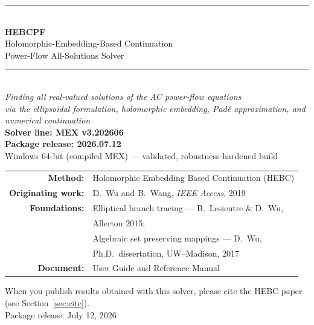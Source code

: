 \documentclass[11pt,a4paper]{article}
\begin{document}
\begin{titlepage}
\centering
\vspace*{2.2cm}
{\color{rule}\rule{\textwidth}{1.2pt}}\\[8pt]
{\Huge\bfseries HEBCPF}\\[10pt]
{\LARGE Holomorphic-Embedding-Based Continuation}\\[4pt]
{\LARGE Power-Flow All-Solutions Solver}\\[10pt]
{\color{rule}\rule{\textwidth}{1.2pt}}\\[18pt]
{\large\itshape Finding \emph{all} real-valued solutions of the AC power-flow equations}\\[6pt]
{\large\itshape via the ellipsoidal formulation, holomorphic embedding, Pad\'e approximation, and numerical continuation}\\[26pt]

{\large\bfseries Solver line: MEX v3.202606}\\[2pt]
{\large\bfseries Package release: 2026.07.12}\\[4pt]
{\large Windows 64-bit (compiled MEX) --- validated, robustness-hardened build}\\[12pt]

\begin{tabular}{rl}
\textbf{Method:} & Holomorphic Embedding Based Continuation (HEBC)\\[3pt]
\textbf{Originating work:} & D.\ Wu and B.\ Wang, \emph{IEEE Access}, 2019\\[6pt]
\textbf{Foundations:} & Elliptical branch tracing --- B.\ Lesieutre \& D.\ Wu,\\[1pt]
                      & Allerton 2015;\\[3pt]
                      & Algebraic set preserving mappings --- D.\ Wu,\\[1pt]
                      & Ph.D.\ dissertation, UW--Madison, 2017\\[6pt]
\textbf{Document:} & User Guide and Reference Manual\\
\end{tabular}

\vfill
{\small When you publish results obtained with this solver, please cite the HEBC
paper (see Section~\ref{sec:cite}).}\\[6pt]
{\small Package release: July 12, 2026}
\end{titlepage}

\tableofcontents
\newpage
\end{document}
